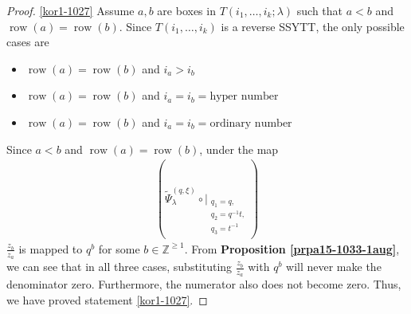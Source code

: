 \documentclass[12pt,reqno,a4paper]{amsart}
\newcommand{\comp}{\circ}
\newcommand{\bb}[1]{\mathbb{#1}}
\numberwithin{equation}{section}
\newcommand{\dualmap}{
\widetilde{\Psi}^{(q,\xi)}_{\lambda}
}
\theoremstyle{definition}
\begin{document}
\begin{proof}
\eqref{kor1-1027} Assume $a,b$ are boxes in $T(i_1,\dots,i_k;\lambda)$ such that $a < b$ and $\operatorname{row}(a) = \operatorname{row}(b)$. 
Since $T(i_1,\dots,i_k)$ is a reverse SSYTT, the only possible cases are 
\begin{itemize}
	\item $\operatorname{row}(a) = \operatorname{row}(b)$ and $i_a > i_b$
	\item $\operatorname{row}(a) = \operatorname{row}(b)$ and $i_a = i_b = \text{hyper number}$
	\item $\operatorname{row}(a) = \operatorname{row}(b)$ and $i_a = i_b = \text{ordinary number}$
\end{itemize}
Since $a < b$ and $\operatorname{row}(a) = \operatorname{row}(b)$, under the map 
\begin{align}
	(
	\dualmap
	\comp 
	\bigg|_{
		\substack{
			q_1 = q, \\
			q_2 = q^{-1}t,\\
			q_3 = t^{-1} \\
		}
	}
	)
\end{align}
$\displaystyle \frac{z_b}{z_a}$ is mapped to $q^b$ for some $b \in \bb{Z}^{\geq 1}$. From \textbf{Proposition \ref{prpa15-1033-1aug}}, we can see that in all three cases, substituting $\displaystyle \frac{z_b}{z_a}$ with $q^b$ will never make the denominator zero. Furthermore, the numerator also does not become zero. Thus, we have proved statement \eqref{kor1-1027}. 
\vspace{0.2cm}


\end{proof}
\end{document}

